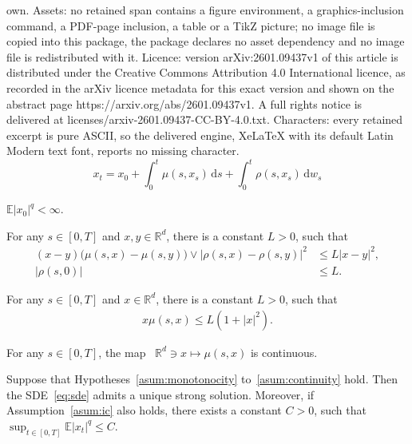 \documentclass[10pt,a4paper]{amsart}
\newcommand{\E}{\mathbb E}
\begin{document}
own. Assets: no retained span contains a figure environment, a graphics-inclusion command, a PDF-page inclusion, a table or a TikZ picture; no image file is copied into this package, the package declares no asset dependency and no image file is redistributed with it. Licence: version arXiv:2601.09437v1 of this article is distributed under the Creative Commons Attribution 4.0 International licence, as recorded in the arXiv licence metadata for this exact version and shown on the abstract page https://arxiv.org/abs/2601.09437v1. A full rights notice is delivered at licenses/arxiv-2601.09437-CC-BY-4.0.txt. Characters: every retained excerpt is pure ASCII, so the delivered engine, XeLaTeX with its default Latin Modern text font, reports no missing character.
\begin{equation}\label{eq:sde}
	x_t = x_0 + \int_0^t \mu(s, x_s) \, \mathrm{d}s + \int_0^t \rho(s, x_s) \, \mathrm{d}w_s
\end{equation}

\begin{asump}\label{asum:ic}
	$\E|x_0|^{q}<\infty$.
\end{asump}

\begin{asump} \label{asum:monotonocity}
	For any $s\in[0,T]$ and $x, y\in \mathbb R^d$, there is a   constant $L>0$,  such that
	\begin{align*}
		(x-y)\big(\mu(s,x)-\mu(s,y)\big)\vee |\rho(s,x)-\rho(s,y)|^2 
		&\leq   L|x-y|^2,
		\\
		|\rho(s,0)|&\leq L.
	\end{align*}
\end{asump}

\begin{asump}
	\label{asum:coercivity}
	For any \( s \in [0,T] \) and \( x \in \mathbb{R}^d \), there is a constant \( L>0 \), such that
	\begin{align*}
		x\mu(s,x) \leq  L(1+|x|^{2}).
	\end{align*}
	
\end{asump}

\begin{asump} \label{asum:continuity}
	For any $s\in  [0,T]$, the map \, $\mathbb R^d\ni x\mapsto \mu(s,x)$ is  continuous.
\end{asump}

\begin{proposition} \label{prop:mb:sde}
	Suppose that Hypotheses~\mbox{\normalfont\ref{asum:monotonocity}} to~\mbox{\normalfont\ref{asum:continuity}} hold. Then the SDE~\eqref{eq:sde} admits a unique strong solution. Moreover, if Assumption~\mbox{\normalfont\ref{asum:ic}} also holds, there exists a constant $C > 0$, such that
	\(
	\sup_{t \in [0,T]} \E|x_t|^q \leq C.
	\)
\end{proposition}
\end{document}
